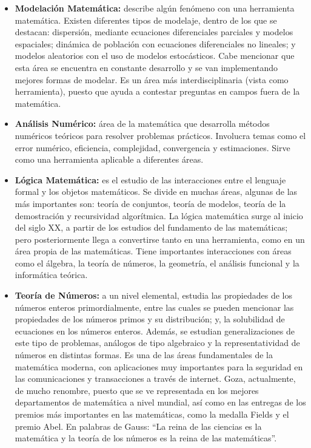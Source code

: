 \begin{itemize}
    \color{blue} \item \color{black} \textbf{Modelación Matemática:} describe algún fenómeno con una herramienta matemática. Existen diferentes tipos de modelaje, dentro de los que se destacan: dispersión, mediante ecuaciones diferenciales parciales y modelos espaciales; dinámica de población con ecuaciones diferenciales no lineales; y modelos aleatorios con el uso de modelos estocásticos. Cabe mencionar que esta área se encuentra en constante desarrollo y se van implementando mejores formas de modelar. Es un área más interdisciplinaria (vista como herramienta), puesto que ayuda a contestar preguntas en campos fuera de la matemática.
    
     \color{blue} \item \color{black} \textbf{Análisis Numérico:} área de la matemática que desarrolla métodos numéricos teóricos para resolver problemas prácticos. Involucra temas como el error numérico, eficiencia, complejidad, convergencia y estimaciones. Sirve como una herramienta aplicable a diferentes áreas.
     
    \color{blue} \item \color{black} \textbf{Lógica Matemática:} es el estudio de las interacciones entre el lenguaje formal y los objetos matemáticos.  Se divide en muchas áreas, algunas de las más importantes son: teoría de conjuntos, teoría de modelos, teoría de la demostración y recursividad algorítmica. La lógica matemática surge al inicio del siglo XX, a partir de los estudios del fundamento de las matemáticas; pero posteriormente llega a convertirse tanto en una herramienta, como en un área propia de las matemáticas. Tiene importantes interacciones con áreas como el álgebra, la teoría de números, la geometría, el análisis funcional y la informática teórica.
    
     \color{blue} \item \color{black} \textbf{Teoría de Números:} a un nivel elemental, estudia las propiedades de los números enteros primordialmente, entre las cuales se pueden mencionar las propiedades de los números primos y su distribución; y, la solubilidad de ecuaciones en los números enteros. Además, se estudian generalizaciones de este tipo de problemas, análogos de tipo algebraico y la representatividad de números en distintas formas. Es una de las áreas fundamentales de la matemática moderna, con aplicaciones muy importantes para la seguridad en las comunicaciones y transacciones a través de internet. Goza, actualmente, de mucho renombre, puesto que se ve representada en los mejores departamentos de matemática a nivel mundial, así como en las entregas de los premios más importantes en las matemáticas, como la medalla Fields y el premio Abel. En palabras de Gauss: “La reina de las ciencias es la matemática y la teoría de los números es la reina de las matemáticas”. 
     

\end{itemize}
